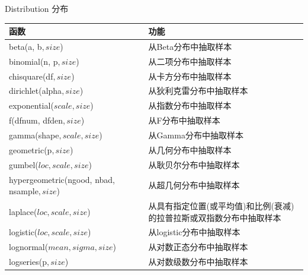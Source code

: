 \documentclass[ignorenonframetext,11pt,xcolor=dvipsnames,hyperref={colorlinks,allcolors=.,urlcolor=blue, citecolor=violet, bookmarksdepth=4},aspectratio=1610]{beamer}
\begin{document}
\begin{frame}{Distribution 分布}
\protect\hypertarget{distribution-}{}

\scriptsize

\begin{longtable}[]{@{}ll@{}}
\toprule
函数 & 功能\tabularnewline
\midrule
\endhead
beta(a, b\(, size\)) & 从Beta分布中抽取样本\tabularnewline
binomial(n, p\(, size\)) & 从二项分布中抽取样本\tabularnewline
chisquare(df\(, size\)) & 从卡方分布中抽取样本\tabularnewline
dirichlet(alpha\(, size\)) & 从狄利克雷分布中抽取样本\tabularnewline
exponential(\(scale, size\)) & 从指数分布中抽取样本\tabularnewline
f(dfnum, dfden\(, size\)) & 从F分布中抽取样本\tabularnewline
gamma(shape\(, scale, size\)) & 从Gamma分布中抽取样本\tabularnewline
geometric(p\(, size\)) & 从几何分布中抽取样本\tabularnewline
gumbel(\(loc, scale, size\)) & 从耿贝尔分布中抽取样本\tabularnewline
hypergeometric(ngood, nbad, nsample\(, size\)) &
从超几何分布中抽取样本\tabularnewline
laplace(\(loc, scale, size\)) &
从具有指定位置(或平均值)和比例(衰减)的拉普拉斯或双指数分布中抽取样本\tabularnewline
logistic(\(loc, scale, size\)) & 从logistic分布中抽取样本\tabularnewline
lognormal(\(mean, sigma, size\)) &
从对数正态分布中抽取样本\tabularnewline
logseries(p\(, size\)) & 从对数级数分布中抽取样本\tabularnewline
\bottomrule
\end{longtable}

\end{frame}
\end{document}
